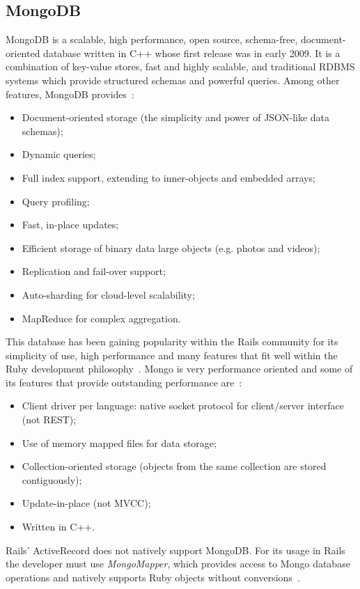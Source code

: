 \subsection{MongoDB}
MongoDB is a scalable, high performance, open source, schema-free, document-oriented database written in C++ whose first release was in early 2009. It is a combination of key-value stores, fast and highly scalable, and traditional RDBMS systems which provide structured schemas and powerful queries. Among other features, MongoDB provides~\cite{mongodb}:
\begin{itemize}
  \item Document-oriented storage (the simplicity and power of JSON-like data schemas);
  \item Dynamic queries;
  \item Full index support, extending to inner-objects and embedded arrays;
  \item Query profiling;
  \item Fast, in-place updates;
  \item Efficient storage of binary data large objects (e.g. photos and videos);
  \item Replication and fail-over support;
  \item Auto-sharding for cloud-level scalability;
  \item MapReduce for complex aggregation.
\end{itemize}
This database has been gaining popularity within the Rails community for its simplicity of use, high performance and many features that fit well within the Ruby development  philosophy~\cite{mongodb_rails}. Mongo is very performance oriented and some of its features that provide outstanding performance are~\cite{mongodb_couchdb}:
\begin{itemize}
  \item Client driver per language: native socket protocol for client/server interface (not REST);
  \item Use of memory mapped files for data storage;
  \item Collection-oriented storage (objects from the same collection are stored contiguously);
  \item Update-in-place (not MVCC);
  \item Written in C++.
\end{itemize}
Rails' ActiveRecord does not natively support MongoDB. For its usage in Rails the developer must use \textit{MongoMapper}, which provides access to Mongo database operations and natively supports Ruby objects without conversions~\cite{mongomapper}.

